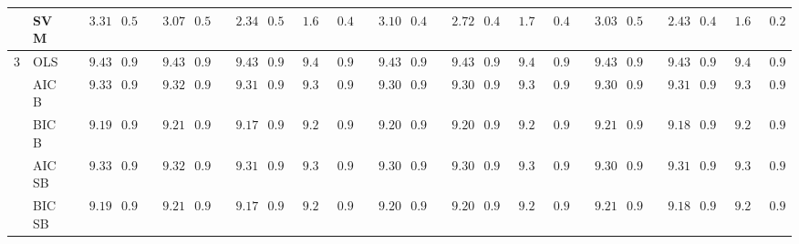 \begin{tabular}{ll|ll|llllll|llllll|llllll}
 & SVM  & $\phantom{00}3.31$ & $\phantom{0}0.56$ & $\phantom{00}3.07$ & $\phantom{0}0.53$ & $\phantom{00}2.34$ & $\phantom{0}0.50$ & $\phantom{0}1.60$ & $\phantom{0}0.41$ & $\phantom{00}3.10$ & $\phantom{0}0.49$ & $\phantom{00}2.72$ & $\phantom{0}0.48$ & $\phantom{0}1.77$ & $\phantom{0}0.42$ & $\phantom{00}3.03$ & $\phantom{0}0.51$ & $\phantom{00}2.43$ & $\phantom{0}0.49$ & $\phantom{0}1.67$ & $\phantom{0}0.26$ \\\hline
3 & OLS  & $\phantom{00}9.43$ & $\phantom{0}0.98$ & $\phantom{00}9.43$ & $\phantom{0}0.98$ & $\phantom{00}9.43$ & $\phantom{0}0.98$ & $\phantom{0}9.43$ & $\phantom{0}0.98$ & $\phantom{00}9.43$ & $\phantom{0}0.98$ & $\phantom{00}9.43$ & $\phantom{0}0.98$ & $\phantom{0}9.43$ & $\phantom{0}0.98$ & $\phantom{00}9.43$ & $\phantom{0}0.98$ & $\phantom{00}9.43$ & $\phantom{0}0.98$ & $\phantom{0}9.43$ & $\phantom{0}0.98$ \\
 & AIC B  & $\phantom{00}9.33$ & $\phantom{0}0.97$ & $\phantom{00}9.32$ & $\phantom{0}0.98$ & $\phantom{00}9.31$ & $\phantom{0}0.96$ & $\phantom{0}9.35$ & $\phantom{0}0.98$ & $\phantom{00}9.30$ & $\phantom{0}0.96$ & $\phantom{00}9.30$ & $\phantom{0}0.97$ & $\phantom{0}9.31$ & $\phantom{0}0.98$ & $\phantom{00}9.30$ & $\phantom{0}0.96$ & $\phantom{00}9.31$ & $\phantom{0}0.95$ & $\phantom{0}9.33$ & $\phantom{0}0.97$ \\
 & BIC B  & $\phantom{00}9.19$ & $\phantom{0}0.94$ & $\phantom{00}9.21$ & $\phantom{0}0.96$ & $\phantom{00}9.17$ & $\phantom{0}0.95$ & $\phantom{0}9.26$ & $\phantom{0}0.96$ & $\phantom{00}9.20$ & $\phantom{0}0.92$ & $\phantom{00}9.20$ & $\phantom{0}0.93$ & $\phantom{0}9.29$ & $\phantom{0}0.92$ & $\phantom{00}9.21$ & $\phantom{0}0.95$ & $\phantom{00}9.18$ & $\phantom{0}0.92$ & $\phantom{0}9.26$ & $\phantom{0}0.96$ \\
 & AIC SB  & $\phantom{00}9.33$ & $\phantom{0}0.97$ & $\phantom{00}9.32$ & $\phantom{0}0.98$ & $\phantom{00}9.31$ & $\phantom{0}0.96$ & $\phantom{0}9.35$ & $\phantom{0}0.98$ & $\phantom{00}9.30$ & $\phantom{0}0.96$ & $\phantom{00}9.30$ & $\phantom{0}0.97$ & $\phantom{0}9.31$ & $\phantom{0}0.98$ & $\phantom{00}9.30$ & $\phantom{0}0.96$ & $\phantom{00}9.31$ & $\phantom{0}0.95$ & $\phantom{0}9.33$ & $\phantom{0}0.97$ \\
 & BIC SB  & $\phantom{00}9.19$ & $\phantom{0}0.94$ & $\phantom{00}9.21$ & $\phantom{0}0.96$ & $\phantom{00}9.17$ & $\phantom{0}0.95$ & $\phantom{0}9.26$ & $\phantom{0}0.96$ & $\phantom{00}9.20$ & $\phantom{0}0.92$ & $\phantom{00}9.20$ & $\phantom{0}0.93$ & $\phantom{0}9.29$ & $\phantom{0}0.92$ & $\phantom{00}9.21$ & $\phantom{0}0.95$ & $\phantom{00}9.18$ & $\phantom{0}0.92$ & $\phantom{0}9.26$ & $\phantom{0}0.96$ \\

\end{tabular}
